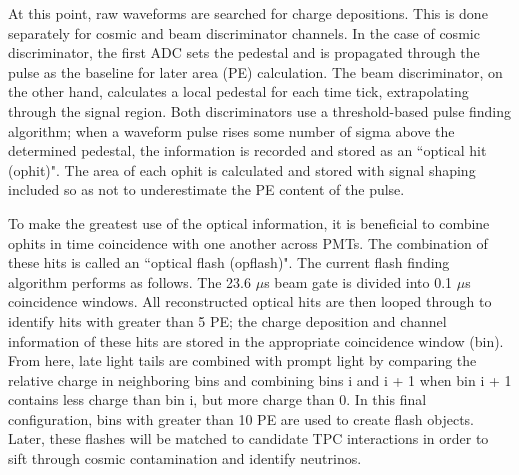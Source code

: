 \par At this point, raw waveforms are searched for charge depositions.  This is done separately for cosmic and beam discriminator channels. In the case of cosmic discriminator, the first ADC sets the pedestal and is propagated through the pulse as the baseline for later area (PE) calculation. The beam discriminator, on the other hand, calculates a local pedestal for each time tick, extrapolating through the signal region. Both discriminators use a threshold-based pulse finding algorithm; when a waveform pulse rises some number of sigma above the determined pedestal, the information is recorded and stored as an ``optical hit (ophit)".  The area of each ophit is calculated and stored with signal shaping included so as not to underestimate the PE content of the pulse.
\par To make the greatest use of the optical information, it is beneficial to combine ophits in time coincidence with one another across PMTs.  The combination of these hits is called an ``optical flash (opflash)".  The current flash finding algorithm performs as follows. The 23.6 $\mu$s beam gate is divided into 0.1 $\mu$s coincidence windows. All reconstructed optical hits are then looped through to identify hits with greater than 5 PE; the charge deposition and channel information of these hits are stored in the appropriate coincidence window (bin).  From here, late light tails are combined with prompt light by comparing the relative charge in neighboring bins and combining bins i and i + 1 when bin i + 1 contains less charge than bin i, but more charge than 0.  In this final configuration, bins with greater than 10 PE are used to create flash objects.  Later, these flashes will be matched to candidate TPC interactions in order to sift through cosmic contamination and identify neutrinos. 

